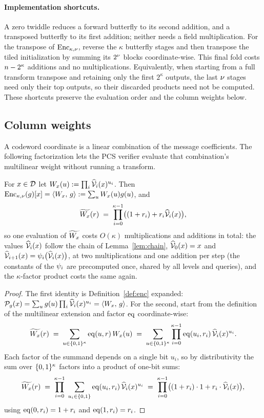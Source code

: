 \paragraph{Implementation shortcuts.} A zero twiddle reduces a forward butterfly to its second addition, and a transposed butterfly to its first addition; neither needs a field multiplication. For the transpose of $\mathrm{Enc}_{\kappa,\nu}$, reverse the $\kappa$ butterfly stages and then transpose the tiled initialization by summing its $2^\nu$ blocks coordinate-wise. This final fold costs $n-2^\kappa$ additions and no multiplications. Equivalently, when starting from a full transform transpose and retaining only the first $2^\kappa$ outputs, the last $\nu$ stages need only their top outputs, so their discarded products need not be computed. These shortcuts preserve the evaluation order and the column weights below.

\subsection{Column weights}\label{sec:ntt-weights}

A codeword coordinate is a linear combination of the message coefficients. The following factorization lets the PCS verifier evaluate that combination's multilinear weight without running a transform.

\begin{lemma}\label{lem:colweight}
For $x \in \mathcal{D}$ let $W_x(u) := \prod_i \widehat{\mathcal{V}}_{i}(x)^{u_i}$. Then $\mathrm{Enc}_{\kappa,\nu}(g)[x] = \langle W_x,\, g \rangle := \sum_u W_x(u) g(u)$, and
\[
\widetilde{W_x}(r) \;=\; \prod_{i=0}^{\kappa-1} \bigl( (1+r_i) + r_i \widehat{\mathcal{V}}_{i}(x) \bigr),
\]
so one evaluation of $\widetilde{W_x}$ costs $O(\kappa)$ multiplications and additions in total: the values $\widehat{\mathcal{V}}_{i}(x)$ follow the chain of Lemma~\ref{lem:chain}, $\widehat{\mathcal{V}}_{0}(x) = x$ and $\widehat{\mathcal{V}}_{i+1}(x) = \psi_i\bigl(\widehat{\mathcal{V}}_{i}(x)\bigr)$, at two multiplications and one addition per step (the constants of the $\psi_i$ are precomputed once, shared by all levels and queries), and the $\kappa$-factor product costs the same again.
\end{lemma}

\begin{proof}
The first identity is Definition~\ref{def:enc} expanded: $\mathcal{P}_g(x) = \sum_u g(u) \prod_i \widehat{\mathcal{V}}_{i}(x)^{u_i} = \langle W_x,\, g \rangle$. For the second, start from the definition of the multilinear extension and factor $\operatorname{eq}$ coordinate-wise:
\[
\widetilde{W_x}(r) \;=\; \sum_{u \in \{0,1\}^{\kappa}} \operatorname{eq}(u, r)\, W_x(u) \;=\; \sum_{u \in \{0,1\}^{\kappa}} \prod_{i=0}^{\kappa-1} \operatorname{eq}(u_i, r_i)\, \widehat{\mathcal{V}}_{i}(x)^{u_i} .
\]
Each factor of the summand depends on a single bit $u_i$, so by distributivity the sum over $\{0,1\}^{\kappa}$ factors into a product of one-bit sums:
\[
\widetilde{W_x}(r) \;=\; \prod_{i=0}^{\kappa-1} \; \sum_{u_i \in \{0,1\}} \operatorname{eq}(u_i, r_i)\, \widehat{\mathcal{V}}_{i}(x)^{u_i} \;=\; \prod_{i=0}^{\kappa-1} \bigl( (1+r_i) \cdot 1 + r_i \cdot \widehat{\mathcal{V}}_{i}(x) \bigr),
\]
using $\operatorname{eq}(0, r_i) = 1 + r_i$ and $\operatorname{eq}(1, r_i) = r_i$.
\end{proof}
